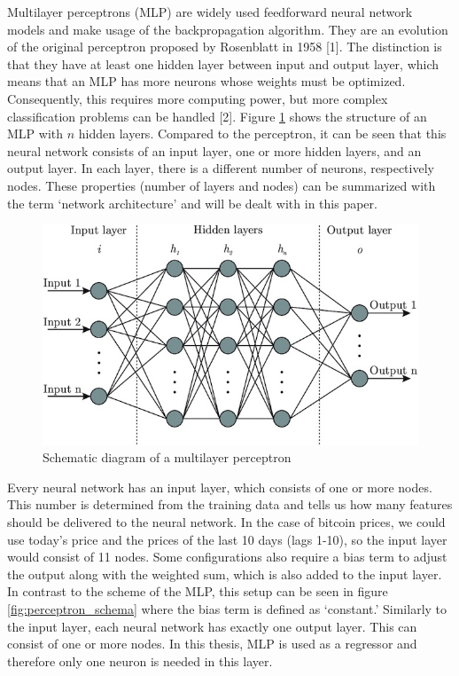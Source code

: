 \documentclass[
]{article}
\begin{document}
Multilayer perceptrons (MLP) are widely used feedforward neural network
models and make usage of the backpropagation algorithm. They are an
evolution of the original perceptron proposed by Rosenblatt in 1958
{[}1{]}. The distinction is that they have at least one hidden layer
between input and output layer, which means that an MLP has more neurons
whose weights must be optimized. Consequently, this requires more
computing power, but more complex classification problems can be handled
{[}2{]}. Figure \ref{fig:mlp_schema} shows the structure of an MLP with
\(n\) hidden layers. Compared to the perceptron, it can be seen that
this neural network consists of an input layer, one or more hidden
layers, and an output layer. In each layer, there is a different number
of neurons, respectively nodes. These properties (number of layers and
nodes) can be summarized with the term `network architecture' and will
be dealt with in this paper.

\begin{figure}

{\centering \includegraphics[width=0.6\linewidth]{images/MLP} 

}

\caption{Schematic diagram of a multilayer perceptron}\label{fig:mlp_schema}
\end{figure}

Every neural network has an input layer, which consists of one or more
nodes. This number is determined from the training data and tells us how
many features should be delivered to the neural network. In the case of
bitcoin prices, we could use today's price and the prices of the last 10
days (lags 1-10), so the input layer would consist of 11 nodes. Some
configurations also require a bias term to adjust the output along with
the weighted sum, which is also added to the input layer. In contrast to
the scheme of the MLP, this setup can be seen in figure
\ref{fig:perceptron_schema} where the bias term is defined as
`constant.' Similarly to the input layer, each neural network has
exactly one output layer. This can consist of one or more nodes. In this
thesis, MLP is used as a regressor and therefore only one neuron is
needed in this layer.
\end{document}
